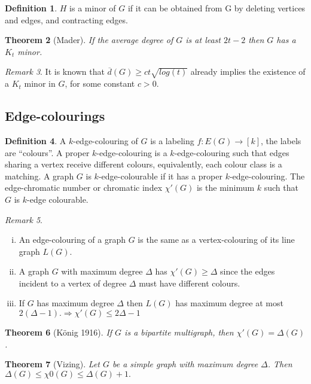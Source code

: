 \documentclass[11pt, fleqn, a4paper, landscape]{article}
\theoremstyle{plain} %
\newtheorem{thm}{Theorem}
\theoremstyle{remark} %
\newtheorem{rem}[thm]{Remark}
\theoremstyle{definition} %
\newtheorem{defi}[thm]{Definition}
\begin{document}
\begin{multicols}{3}
\begin{defi}
$H$ is a minor of $G$ if it can be obtained from G by deleting vertices and edges, and contracting edges.
\end{defi}
\addtocounter{thm}{2}
\begin{thm}[Mader]
If the average degree of $G$ is at least $2t-2$ then $G$ has a $K_t$ minor.
\end{thm}

\begin{rem}
It is known that $\overline{d}(G) \ge ct\sqrt{log(t)}$ already implies the existence of a $K_t$ minor in $G$, for some constant $c > 0$.
\end{rem}
\subsection{Edge-colourings}
\begin{defi}
A $k$-edge-colouring of $G$ is a labeling $f : E(G) \to [k]$, the labels are “colours”. A proper $k$-edge-colouring is a $k$-edge-colouring such that edges sharing a vertex receive different colours, equivalently, each colour class is a matching. A graph $G$ is $k$-edge-colourable if it has a
proper $k$-edge-colouring. The edge-chromatic number or chromatic index $\chi'(G)$ is the minimum $k$ such that $G$ is $k$-edge colourable.
\end{defi}

\begin{rem}
\begin{enumerate}[(i)]
\item An edge-colouring of a graph $G$ is the same as a vertex-colouring of its line graph $L(G)$.
\item A graph $G$ with maximum degree $\Delta$ has $\chi'(G) \ge \Delta$ since the edges incident to a vertex of degree $\Delta$ must have different colours.
\item If $G$ has maximum degree $\Delta$ then $L(G)$ has maximum degree at most $2(\Delta-1).\Rightarrow \chi'(G) \le 2\Delta - 1$ 
\end{enumerate}
\end{rem}

\begin{thm}[König 1916]
If $G$ is a bipartite multigraph, then $\chi'(G) = \Delta(G)$.
\end{thm}

\begin{thm}[Vizing]
Let $G$ be a simple graph with maximum degree $\Delta$. Then $\Delta(G)\le \chi0(G) \le \Delta(G) + 1.$
\end{thm}
\addtocounter{thm}{1}


\end{multicols}
\end{document}
